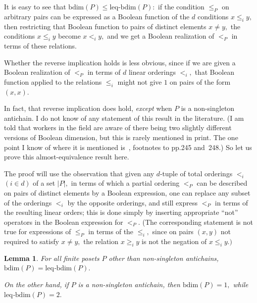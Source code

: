 \documentclass{amsart}
\newtheorem{lemma}[theorem]{Lemma}
\numberwithin{equation}{section}
\numberwithin{theorem}{section}
\renewcommand{\r}{\mathrm}
\newcommand{\2}{\mathbf{2}}
\begin{document}
It is easy to see that $\r{bdim}(P)\leq \r{leq}\!$-$\!\r{bdim}(P)\!:$
if the condition $\leq_P$ on arbitrary pairs can be expressed
as a Boolean function of the $d$ conditions $x\leq_i y,$
then restricting that Boolean function to pairs of distinct
elements $x\neq y,$ the conditions $x\leq_i y$ become $x<_i y,$ and
we get a Boolean realization of $<_P$ in terms of these relations.

Whether the reverse implication
holds is less obvious, since if we are given a
Boolean realization of $<_P$ in terms of $d$ linear
orderings $<_i,$ that Boolean function applied to the relations
$\leq_i$ might not give $1$ on pairs of the form $(x,x).$

In fact, that reverse implication does
hold, {\em except} when $P$ is a non-singleton antichain.
I do not know of any statement of this result in the literature.
(I am told that workers in the field are aware
of there being two slightly different versions of Boolean dimension,
but this is rarely mentioned in print.
The one point I know of where it is mentioned
is~\cite{comparing}, footnotes to pp.245 and~248.)
So let us prove this almost-equivalence result here.

The proof will use the observation that given any $\!d\!$-tuple
of total orderings $<_i$ $(i\in d)$ of a set $|P|,$ in terms of
which a partial ordering $<_P$ can be described on pairs
of distinct elements by a Boolean
expression, one can replace any subset of the orderings $<_i$ by
the opposite orderings, and still express $<_P$ in terms of the
resulting linear orders; this is done simply by inserting
appropriate ``not'' operators in the Boolean expression for $<_P.$
(The corresponding statement is not true for
expressions of $\leq_P$ in terms of the $\leq_i,$ since
on pairs $(x,y)$ not required to satisfy
$x\neq y,$ the relation $x \geq_i y$ is not
the negation of $x \leq_i y.)$

\begin{lemma}\label{L.leq-Bool}
For all finite posets $P$ other than non-singleton antichains,
$\r{bdim}(P)=\r{leq}\!$-$\!\r{bdim}(P).$

On the other hand, if $P$ is a non-singleton antichain,
then $\r{bdim}(P)=1,$ while $\r{leq}\!$-$\!\r{bdim}(P)=2.$
\end{lemma}
\end{document}
